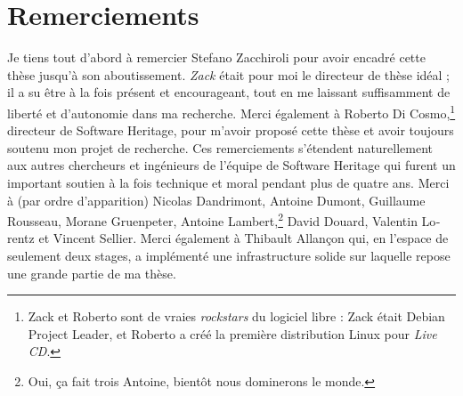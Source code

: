 \chapter*{Remerciements}

\begin{otherlanguage}{french}
\begin{SingleSpace}

  Je tiens tout d'abord à remercier Stefano Zacchiroli pour avoir encadré cette
  thèse jusqu'à son aboutissement. \emph{Zack} était pour moi le directeur de
  thèse idéal ; il a su être à la fois présent et encourageant, tout en me
  laissant suffisamment de liberté et d'autonomie dans ma recherche. Merci
  également à Roberto Di Cosmo,\footnote{Zack et Roberto sont de vraies
  \emph{rockstars} du logiciel libre : Zack était Debian Project Leader, et
  Roberto a créé la première distribution Linux pour \emph{Live CD}.
  } directeur de Software Heritage, pour m'avoir proposé cette thèse et avoir
  toujours soutenu mon projet de recherche.  Ces remerciements s'étendent
  naturellement aux autres chercheurs et ingénieurs de l'équipe de Software
  Heritage qui furent un important soutien à la fois technique et moral pendant
  plus de quatre ans. Merci à (par ordre d'apparition) Nicolas Dandrimont,
  Antoine Dumont, Guillaume Rousseau, Morane Gruenpeter, Antoine
  Lambert,\footnote{Oui, ça fait trois Antoine, bientôt nous dominerons le
  monde.} David Douard, Valentin Lorentz et Vincent Sellier. Merci également à
  Thibault Allançon qui, en l'espace de seulement deux stages, a implémenté une
  infrastructure solide sur laquelle repose une grande partie de ma thèse.


\end{SingleSpace}
\end{otherlanguage}
